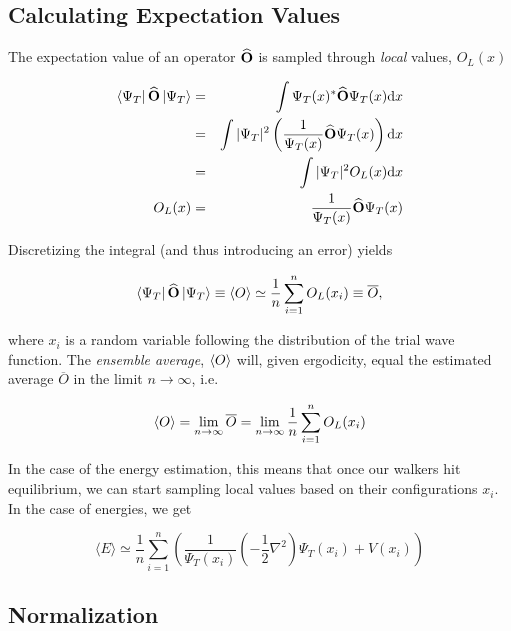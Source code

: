 \subsection{Calculating Expectation Values}
\label{sec:calcExpVals}

The expectation value of an operator ${\bf\widehat{O}}$ is sampled through \textit{local} values, $O_L(x)$

\begin{eqnarray}
 \left< \Psi_T \right|{\bf\widehat{O}}\left| \Psi_T \right> &=& \int \Psi_T(x)^\ast {\bf\widehat{O}} \Psi_T(x)\mathrm{d}x \nonumber\\
                                &=& \int |\Psi_T|^2\left(\frac{1}{\Psi_T(x)}{\bf\widehat{O}}\Psi_T(x)\right)\mathrm{d}x \nonumber\\
                                &=& \int |\Psi_T|^2 O_L(x)\mathrm{d}x \\
                         O_L(x) &=& \frac{1}{\Psi_T(x)}{\bf\widehat{O}}\Psi_T(x)           
\end{eqnarray}

Discretizing the integral (and thus introducing an error) yields 

\begin{equation}
 \left< \Psi_T \right|{\bf\widehat{O}}\left| \Psi_T \right> \equiv \left< O \right> \simeq \frac{1}{n}\sum_{i=1}^n O_L(x_i) \equiv \overline{O},
\end{equation}

where $x_i$ is a random variable following the distribution of the trial wave function. The \textit{ensemble average},  $\left< O \right>$ will, given ergodicity, equal the estimated average $\overline{O}$ in the limit $n\rightarrow\infty$, i.e.

\begin{equation}
 \label{eq:MeanVStrueExp}
 \left< O \right> = \lim_{n\to\infty} \overline{O} = \lim_{n\to\infty}\frac{1}{n}\sum_{i=1}^n O_L(x_i)
\end{equation}


In the case of the energy estimation, this means that once our walkers hit equilibrium, we can start sampling local values based on their configurations $x_i$. In the case of energies, we get

\begin{equation}
 \langle E \rangle \simeq \frac{1}{n}\sum_{i=1}^n \left(\frac{1}{\Psi_T(x_i)}\left(-\frac{1}{2}\nabla^2\right)\Psi_T(x_i) + V(x_i)\right)
\end{equation}

\subsection{Normalization}

